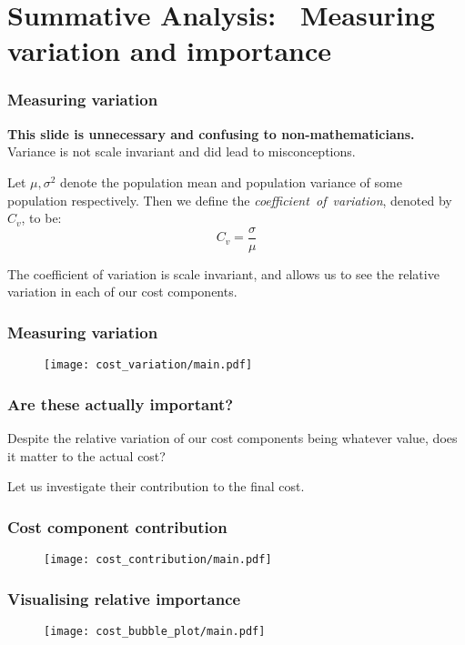 \section{Summative Analysis:%
         \ Measuring variation and importance}

\begin{frame}
    \frametitle{Measuring variation}
    \textbf{This slide is unnecessary and confusing to non-mathematicians.}
    Variance is not scale invariant and did lead to misconceptions.

    \pause%
    \vspace{10pt}
    \begin{definition}
        Let \(\mu, \sigma^2\) denote the population mean and population variance
        of some population respectively. Then we define the
        \emph{coefficient~of~variation}, denoted by \(C_v\), to be:
        \[
            C_v = \frac{\sigma}{\mu}
        \]
    \end{definition}

    \pause%
    The coefficient of variation is scale invariant, and allows us to see the
    relative variation in each of our cost components.
\end{frame}

\begin{frame}
    \frametitle{Measuring variation}

    \begin{figure}
    \texttt{[image: cost\_variation/main.pdf]}
    \end{figure}
\end{frame}

\begin{frame}
    \frametitle{Are these actually important?}

    Despite the relative variation of our cost components being whatever value,
    does it matter to the actual cost?

    \vspace{10pt}
    Let us investigate their contribution to the final cost.
\end{frame}

\begin{frame}
    \frametitle{Cost component contribution}

    \begin{figure}
    \texttt{[image: cost\_contribution/main.pdf]}
    \end{figure}
\end{frame}

\begin{frame}
    \frametitle{Visualising relative importance}

    \begin{figure}
    \texttt{[image: cost\_bubble\_plot/main.pdf]}
    \end{figure}
\end{frame}
